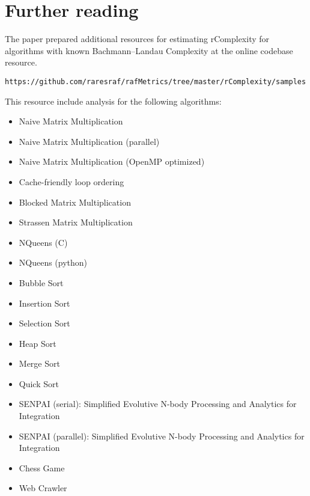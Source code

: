\section{Further reading}
The paper prepared additional resources for estimating rComplexity for algorithms with known Bachmann–Landau Complexity at the online codebase resource.
\begin{verbatim}
https://github.com/raresraf/rafMetrics/tree/master/rComplexity/samples
\end{verbatim}
This resource include analysis for the following algorithms:
\begin{itemize}
\item Naive Matrix Multiplication
\item Naive Matrix Multiplication (parallel)	
\item Naive Matrix Multiplication (OpenMP optimized)	
\item Cache-friendly loop ordering
\item Blocked Matrix Multiplication	
\item Strassen Matrix Multiplication	
\item NQueens (C)	
\item NQueens (python)	
\item Bubble Sort	
\item Insertion Sort	
\item Selection Sort	
\item Heap Sort	
\item Merge Sort	
\item Quick Sort	
\item SENPAI (serial): Simplified Evolutive N-body Processing and Analytics for Integration
\item SENPAI (parallel): Simplified Evolutive N-body Processing and Analytics for Integration
\item Chess Game
\item Web Crawler
\end{itemize}
